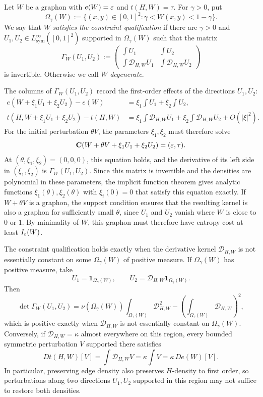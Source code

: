 \begin{defn}\label{def:constraint-qualification}
Let $W$ be a graphon with $e(W)=\varepsilon$ and $t(H,W)=\tau$.  For $\gamma>0$, put
\[
  \Omega_\gamma(W):=\{(x,y)\in[0,1]^2:\gamma<W(x,y)<1-\gamma\}.
\]
We say that $W$
\emph{satisfies the constraint qualification} if there are $\gamma>0$ and
$U_1,U_2\in L^\infty_{\mathrm{sym}}([0,1]^2)$ supported in $\Omega_\gamma(W)$
such that the matrix
\begin{equation*}
  \Gamma_W(U_1,U_2):=
  \begin{pmatrix}
    \int U_1 & \int U_2\\[1mm]
    \int\mathcal D_{H,W}U_1 & \int\mathcal D_{H,W}U_2
  \end{pmatrix}
\end{equation*}
is invertible.  Otherwise we call $W$ \emph{degenerate}.
\end{defn}

The columns of $\Gamma_W(U_1,U_2)$ record the first-order effects of the
directions $U_1,U_2$:
\begin{align*}
  e(W+\xi_1U_1+\xi_2U_2)-e(W)
    &=\xi_1\int U_1+\xi_2\int U_2,\\
  t(H,W+\xi_1U_1+\xi_2U_2)-t(H,W)
    &=\xi_1\int\mathcal D_{H,W}U_1
      +\xi_2\int\mathcal D_{H,W}U_2+O(|\xi|^2).
\end{align*}
For the initial perturbation $\theta V$, the parameters $\xi_1,\xi_2$ must
therefore solve
\[
  \mathbf C(W+\theta V+\xi_1U_1+\xi_2U_2)=(\varepsilon,\tau).
\]
At $(\theta,\xi_1,\xi_2)=(0,0,0)$, this equation holds, and the derivative
of its left side in $(\xi_1,\xi_2)$ is $\Gamma_W(U_1,U_2)$.
Since this matrix is invertible and the densities are polynomial in
these parameters, the implicit function theorem gives analytic functions
$\xi_1(\theta),\xi_2(\theta)$ with $\xi_i(0)=0$ that satisfy this equation
exactly. If $W+\theta V$ is a graphon, the support condition ensures that the
resulting kernel is also a graphon for sufficiently small $\theta$, since
$U_1$ and $U_2$ vanish where $W$ is close to $0$ or $1$.
By minimality of $W$, this graphon must therefore have entropy
cost at least $I_\varepsilon(W)$.

The constraint qualification holds exactly when the derivative kernel
$\mathcal D_{H,W}$ is not essentially constant on some
$\Omega_\gamma(W)$ of positive measure.
If $\Omega_\gamma(W)$ has positive measure, take
\[
  U_1=\mathbf1_{\Omega_\gamma(W)},\qquad U_2=\mathcal D_{H,W}\mathbf1_{\Omega_\gamma(W)}.
\]
Then
\[
  \det\Gamma_W(U_1,U_2)
  =\nu(\Omega_\gamma(W))\int_{\Omega_\gamma(W)}\mathcal D_{H,W}^2
    -\left(\int_{\Omega_\gamma(W)}\mathcal D_{H,W}\right)^2,
\]
which is positive exactly when $\mathcal D_{H,W}$ is not essentially constant
on $\Omega_\gamma(W)$. Conversely, if $\mathcal D_{H,W}=\kappa$ almost everywhere
on this region, every bounded symmetric perturbation $V$ supported there
satisfies
\[
  Dt(H,W)[V]=\int\mathcal D_{H,W}V=\kappa\int V=\kappa\,De(W)[V].
\]
In particular, preserving edge density also preserves $H$-density to first order,
so perturbations along two directions $U_1,U_2$ supported in this region
may not suffice to restore both densities.

